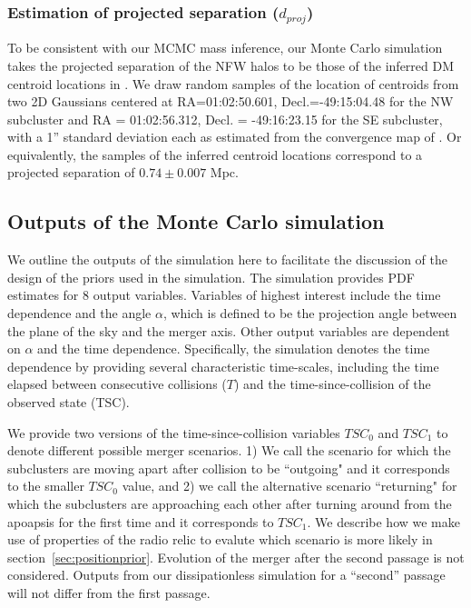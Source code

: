 \subsubsection{Estimation of projected separation ($d_{proj}$)} 
To be consistent with our MCMC mass inference, our Monte Carlo simulation takes 
the projected separation of the NFW halos to be those of the inferred
DM centroid locations in \citealt{Jee13}. We draw random samples
 of the location of centroids from two 2D Gaussians centered at
 RA=01:02:50.601, Decl.=-49:15:04.48 for the NW subcluster and RA =
 01:02:56.312, Decl. = -49:16:23.15 for the SE
subcluster, with a 1'' standard deviation each as estimated from the
convergence map of \citet{Jee13} . Or equivalently, the
samples of the inferred centroid locations correspond to a projected separation of
$0.74\pm {0.007}$ Mpc. 
\subsection{Outputs of the Monte Carlo simulation}\label{sec: outputs}
%

We outline the outputs of the simulation here to facilitate the discussion
of the design of the priors used in the simulation. The simulation
provides PDF estimates for 8 output variables. Variables
of highest interest include the time dependence and the angle $\alpha$, which is
defined to be the projection angle between the plane of the sky and the merger axis. Other output variables are dependent on $\alpha$ and the time
dependence. Specifically, the simulation denotes the time dependence by
providing several characteristic time-scales, including the time
elapsed between consecutive collisions
($T$) and the time-since-collision of the observed state (TSC).  

We provide two versions of the time-since-collision variables $TSC_0$ and
$TSC_1$ to denote different possible merger scenarios. 1) We call the scenario for which the subclusters are
moving apart after collision to be ``outgoing" and it corresponds to the
smaller $TSC_0$ value, and 2) we call the alternative scenario 
``returning" for which the subclusters are approaching each other after turning
around from the apoapsis for the first time and it corresponds to $TSC_1$.
We describe how we make use of properties of the radio relic to evalute
which scenario is more likely in
section~\ref{sec:positionprior}. Evolution of the merger after the second
passage is not considered. Outputs from our dissipationless simulation for
a ``second'' passage will not differ from the first passage.
 
